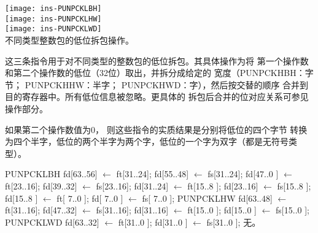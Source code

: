 \begin{instructionblk}
  \texttt{[image: ins-PUNPCKLBH]} \\
  \texttt{[image: ins-PUNPCKLHW]} \\
  \texttt{[image: ins-PUNPCKLWD]} \\
  {不同类型整数包的低位拆包操作。}
  {这三条指令用于对不同类型的整数包的低位拆包。其具体操作为将
  第一个操作数和第二个操作数的低位（32位）取出，并拆分成给定的
  宽度（PUNPCKHBH：字节； PUNPCKHHW：半字； PUNPCKHWD：字），然后按交替的顺序
  合并到目的寄存器中。所有低位信息被忽略。更具体的
  拆包后合并的位对应关系可参见操作部分。
  
  如果第二个操作数值为0， 则这些指令的实质结果是分别将低位的四个字节
  转换为四个半字，低位的两个半字为两个字，低位的一个字为双字（都是无符号类型）。}
  {PUNPCKLBH \narrownewline
  fd[63..56] $\leftarrow$ ft[31..24]; \narrownewline
  fd[55..48] $\leftarrow$ fs[31..24]; \narrownewline
  fd[47..0 ] $\leftarrow$ ft[23..16]; \narrownewline
  fd[39..32] $\leftarrow$ fs[23..16]; \narrownewline
  fd[31..24] $\leftarrow$ ft[15..8 ]; \narrownewline
  fd[23..16] $\leftarrow$ fs[15..8 ]; \narrownewline
  fd[15..8 ] $\leftarrow$  ft[ 7..0 ]; \narrownewline
  fd[ 7..0 ]  $\leftarrow$ fs[ 7..0 ]; \narrownewline \narrownewline
  PUNPCKLHW \narrownewline
  fd[63..48] $\leftarrow$ ft[31..16]; \narrownewline
  fd[47..32] $\leftarrow$ fs[31..16]; \narrownewline
  fd[31..16] $\leftarrow$ ft[15..0 ]; \narrownewline
  fd[15..0 ] $\leftarrow$ fs[15..0 ]; \narrownewline \narrownewline
  PUNPCKLWD \narrownewline
  fd[63..32] $\leftarrow$ ft[31..0 ]; \narrownewline
  fd[31..0 ] $\leftarrow$ fs[31..0 ];}
  {无。}
\end{instructionblk}
